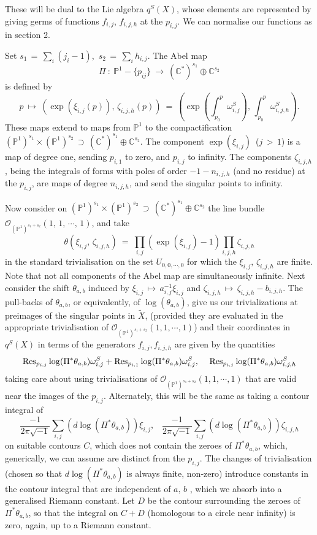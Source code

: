 \documentclass[12pt,reqno]{amsart}
\numberwithin{equation}{section}
\theoremstyle{definition}
\theoremstyle{remark}
\def\bC{{\mathbb {C}}}
\def\bP{{\mathbb {P}}}
\def\pO{{\mathcal O}}
\begin{document}
 These will be dual to the Lie algebra $q^S(X)$, whose elements are represented by giving
germs of functions $f_{i,j},\, f_{i,j,h}$ at the $p_{i,j}$. We can normalise our  functions as in section 2.

Set $s_1 \,=\, \sum_i(j_i-1)$,\,
$s_2\, =\, \sum_i h_{i,j}$. The Abel map
$$\Pi\ :\ \bP^1-\{p_{ij}\}\ \longrightarrow\  (\bC^*)^{s_1} \oplus \bC^{s_2}$$ is defined by 
  $$p\ \longmapsto\ (\exp(\xi_{i,j}(p)) ,\, \zeta_{i,j,h}(p))\ =\ (\exp(\int_{p_0}^p \omega^S_{i, j}) ,
\, \int^p_{p_0}\omega^{S}_{i,j,h}).$$
These maps extend to maps from $\bP^1$ to the compactification $(\bP^1)^{s_1} \times (\bP^1)^{s_2}
\,\supset\, (\bC^*)^{s_1} \oplus \bC^{s_2}$. The component $\exp(\xi_{i,j})$\, ($j\,>\,1$) is a map of degree
one, sending $p_{i,1}$ to zero, and $p_{i,j}$ to infinity. The components $\zeta_{i,j,h}$, being the integrals of
forms with poles of order $-1-n_{i,j,h}$ (and no residue) at the $p_{i,j}$, are maps of degree $n_{i, j,h}$, and send the singular points to infinity. 

Now consider on $(\bP^1)^{s_1} \times (\bP^1)^{s_2}\,\supset\, (\bC^*)^{s_1} \oplus \bC^{s_2}$ the line bundle 
$\pO_{(\bP^1)^{s_1+s_2}}(1,\,1,\,\cdots ,\,1)$, and take 
\begin{equation}\label{def-theta-rat}
\theta( \xi_{i,j},\, \zeta_{i,j,h} )\ =\ \prod_{i,j}(\exp(\xi_{i,j}) -1) \prod_{i,j,h} \zeta_{i,j,h}\end{equation}
in the standard trivialisation on the set $U_{0,0,\cdots ,0}$ for which the $\xi_{i,j},\, \zeta_{i,j,h}$
are finite. Note that not all components of the Abel map are simultaneously infinite. 
Next consider the shift $\theta_{a,b}$ induced by $\xi_{i,j}\,\longmapsto\,a_{i,j}^{-1}\xi_{i,j}$ and
$\zeta_{i,j,h}\,\longmapsto
\,\zeta_{i,j,h}- b_{i,j,h}$. The pull-backs of $\theta_{a,b}$, or equivalently, of $\log(\theta_{a,b})$, give us
our trivializations at preimages of the singular points in $\widetilde X$, (provided they are evaluated
in the appropriate trivialisation of $\pO_{(\bP^1)^{s_1+s_2}}(1,1,\cdots ,1)$) and their  coordinates in
$q^S(X)$ in terms of the generators  $f_{i,j}, f_{i,j,h}$ are given by the quantities
$${\rm Res}_{p_{i,j}} \log (\Pi^*\theta_{a,b}) \omega^S_{i, j} + {\rm Res}_{p_{i,1}} \log (\Pi^*\theta_{a,b}) \omega^S_{i, j},\ \ \ \,
  {\rm Res}_{p_{i ,j}} \log (\Pi^*\theta_{a,b}) \omega^{S}_{i,j,h} $$
taking care about using trivialisations of $\pO_{(\bP^1)^{s_1+s_2}}(1,1,\cdots ,1)$ that are valid  near the images of
the $p_{i,j}$. Alternately, this will be the same as taking a contour integral of 
$$\frac{-1}{2\pi \sqrt{-1}}\sum_{i,j}  (d\log (\Pi^*\theta_{a,b})) \xi_{i, j} ,\ \ \ \,
\frac{-1}{2\pi \sqrt{-1}}\sum_{i,j} (d\log (\Pi^*\theta_{a,b})) \zeta_{i,j,h}$$
on suitable contours $C$, which does not contain the   zeroes of $\Pi^*\theta_{a,b}$, which, generically, we can
assume are distinct from the $p_{i,j}$. The changes of trivialisation (chosen so that $d\log (\Pi^*\theta_{a,b})$ is always finite, non-zero) introduce constants in the contour integral  that are independent
of $a,\,b$ , which we absorb into a generalised Riemann constant.  Let $D$ be the contour surrounding the zeroes of $\Pi^*\theta_{a,b}$, so that the integral on $C+D$ (homologous to a circle near infinity) is zero, again, up to a Riemann constant.
 
\end{document}
